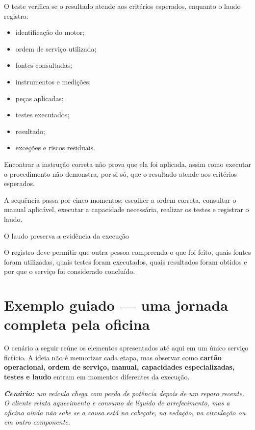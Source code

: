 \documentclass[
  10pt,
  a4paper,
  oneside]{book}
\providecommand{\tightlist}{%
  \setlength{\itemsep}{0pt}\setlength{\parskip}{0pt}}
\renewenvironment{quote}
  {\def\FrameCommand{\fboxsep=10pt\colorbox{LightBlue}}%
   \MakeFramed{\advance\hsize-\width\FrameRestore}\itshape}
  {\endMakeFramed}
\begin{document}
O teste verifica se o resultado atende aos critérios esperados, enquanto
o laudo registra:

\begin{itemize}
\tightlist
\item
  identificação do motor;
\item
  ordem de serviço utilizada;
\item
  fontes consultadas;
\item
  instrumentos e medições;
\item
  peças aplicadas;
\item
  testes executados;
\item
  resultado;
\item
  exceções e riscos residuais.
\end{itemize}

Encontrar a instrução correta não prova que ela foi aplicada, assim como
executar o procedimento não demonstra, por si só, que o resultado atende
aos critérios esperados.

A sequência passa por cinco momentos: escolher a ordem correta,
consultar o manual aplicável, executar a capacidade necessária, realizar
os testes e registrar o laudo.

\begin{evidencebox}{O laudo preserva a evidência da execução}

O registro deve permitir que outra pessoa compreenda o que foi feito,
quais fontes foram utilizadas, quais testes foram executados, quais
resultados foram obtidos e por que o serviço foi considerado concluído.

\end{evidencebox}

\hypertarget{exemplo-guiado-uma-jornada-completa-pela-oficina}{%
\section{Exemplo guiado --- uma jornada completa pela
oficina}\label{exemplo-guiado-uma-jornada-completa-pela-oficina}}

O cenário a seguir reúne os elementos apresentados até aqui em um único
serviço fictício. A ideia não é memorizar cada etapa, mas observar como
\textbf{cartão operacional, ordem de serviço, manual, capacidades
especializadas, testes e laudo} entram em momentos diferentes da
execução.

\begin{quote}
\textbf{Cenário:} um veículo chega com perda de potência depois de um
reparo recente. O cliente relata aquecimento e consumo de líquido de
arrefecimento, mas a oficina ainda não sabe se a causa está no cabeçote,
na vedação, na circulação ou em outro componente.
\end{quote}
\end{document}

